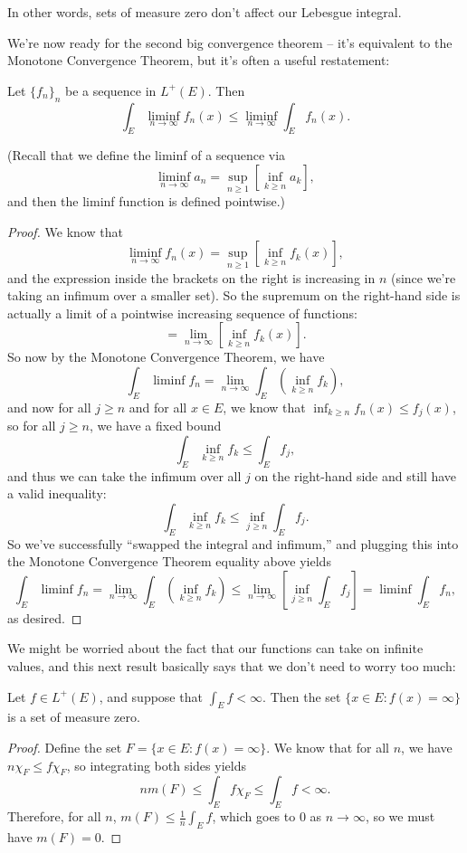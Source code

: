 In other words, sets of measure zero don't affect our Lebesgue integral.

We're now ready for the second big convergence theorem -- it's equivalent to the Monotone Convergence Theorem, but it's often a useful restatement:

\begin{theorem}
Let $\{f_n\}_n$ be a sequence in $L^+(E)$. Then
\[
    \int_E \liminf_{n \to \infty} f_n(x) \le \liminf_{n \to \infty} \int_E f_n(x).
\]
\end{theorem}

(Recall that we define the liminf of a sequence via
\[
    \liminf_{n \to \infty} a_n = \sup_{n \ge 1}\left[\inf_{k \ge n} a_k\right],
\]
and then the liminf function is defined pointwise.)

\begin{proof}
We know that 
\[
    \liminf_{n \to \infty} f_n(x) = \sup_{n \ge 1}\left[\inf_{k \ge n} f_k(x)\right],
\]
and the expression inside the brackets on the right is increasing in $n$ (since we're taking an infimum over a smaller set). So the supremum on the right-hand side is actually a limit of a pointwise increasing sequence of functions:
\[
    = \lim_{n \to \infty} \left[\inf_{k \ge n} f_k(x)\right].
\]  
So now by the Monotone Convergence Theorem, we have
\[
   \int_E \liminf f_n = \lim_{n \to \infty} \int_E \left(\inf_{k \ge n} f_k\right),
\]
and now for all $j \ge n$ and for all $x \in E$, we know that $\inf_{k \ge n} f_n(x) \le f_j(x)$, so for all $j \ge n$, we have a fixed bound
\[
    \int_E \inf_{k \ge n} f_k \le \int_E f_j,
\]
and thus we can take the infimum over all $j$ on the right-hand side and still have a valid inequality:
\[
    \int_E \inf_{k \ge n} f_k \le \inf_{j \ge n} \int_E f_j.
\]
So we've successfully ``swapped the integral and infimum,'' and plugging this into the Monotone Convergence Theorem equality above yields
\[
    \int_E \liminf f_n = \lim_{n \to \infty} \int_E \left(\inf_{k \ge n} f_k\right) \le \lim_{n \to \infty}\left[\inf_{j \ge n} \int_E f_j\right] = \liminf \int_E f_n,
\]
as desired.
\end{proof}

We might be worried about the fact that our functions can take on infinite values, and this next result basically says that we don't need to worry too much:

\begin{theorem}
Let $f \in L^+(E)$, and suppose that $\int_E f < \infty$. Then the set $\{x \in E: f(x) = \infty\}$ is a set of measure zero.
\end{theorem}
\begin{proof}
Define the set $F = \{x \in E: f(x) = \infty\}$. We know that for all $n$, we have $n \chi_F \le f \chi_F$, so integrating both sides yields
\[
    n m(F) \le \int_E f \chi_F \le \int_E f < \infty.
\]
Therefore, for all $n$, $m(F) \le \frac{1}{n} \int_E f$, which goes to $0$ as $n \to \infty$, so we must have $m(F) = 0$.
\end{proof}

